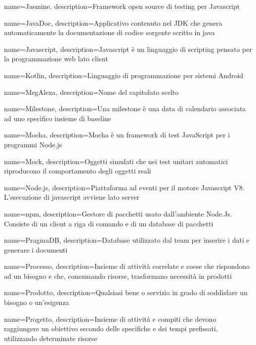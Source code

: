 {
	name={Jasmine},
	description={Framework open source di testing per Javascript}
}

{
	name={JavaDoc},
	description={Applicativo contenuto nel JDK che genera automaticamente la documentazione di codice sorgente scritto in java}
}

{
	name={Javascript},
	description={Javascript è un linguaggio di scripting pensato per la programmazione web lato client}
	{\newpage}
}

{
	name={Kotlin},
	description={Linguaggio di programmazione per sistemi Android}
	{\newpage}
}

{
	name={MegAlexa},
	description={Nome del capitolato scelto}
}

{
	name={Milestone},
	description={Una milestone è una data di calendario associata ad uno specifico insieme di baseline}
}

{
	name={Mocha},
	description={Mocha è un framework di test JavaScript per i programmi Node.js}
}

{
	name={Mock},
	description={Oggetti simulati che nei test unitari automatici riproducono il comportamento degli oggetti reali}
	{\newpage}
}

{
	name={Node.js},
	description={Piattaforma ad eventi per il motore Javascript V8. L’esecuzione di javascript avviene lato server}
}

{
	name={npm},
	description={Gestore di pacchetti usato dall'ambiente Node.Js. Consiste di un client a riga di comando e di un database di pacchetti}
	{\newpage}
}

{
	name={PragmaDB},
	description={Database utilizzato dal team per inserire i dati e generare i documenti}
}

{
	name={Processo},
	description={Insieme di attività correlate e coese che rispondono ad un bisogno e che, consumando risorse, trasformano necessità in prodotti}
}

{
	name={Prodotto},
	description={Qualsiasi bene o servizio in grado di soddisfare un bisogno o un’esigenza}
}

{
	name={Progetto},
	description={Insieme di attività e compiti che devono raggiungere un obiettivo secondo delle specifiche e dei tempi prefissati, utilizzando determinate risorse}
}

